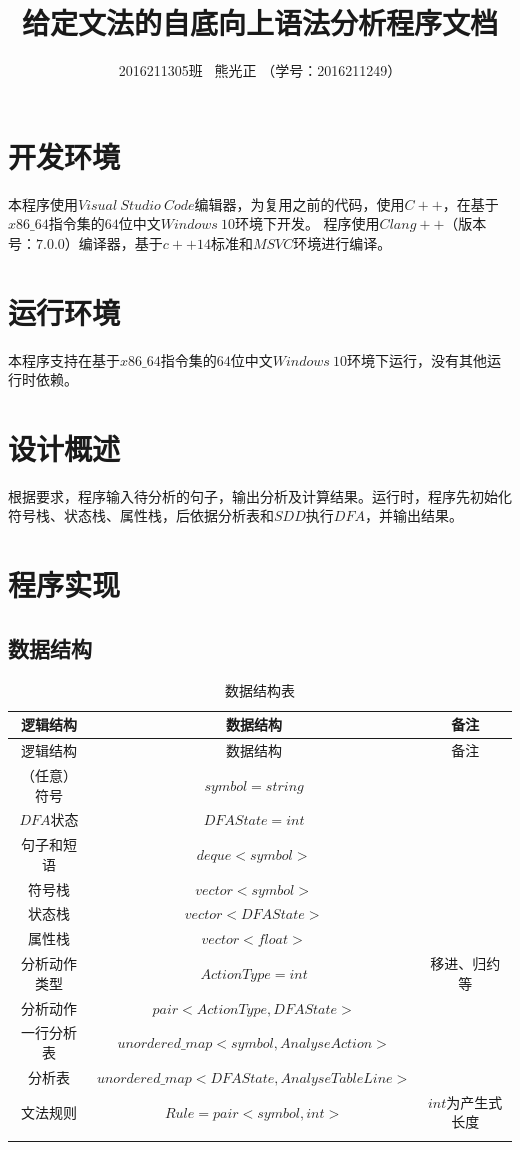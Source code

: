 \documentclass[UTF8]{ctexart}
\title{给定文法的自底向上语法分析程序文档}
\author{2016211305班 \ 熊光正 （学号：2016211249）}
\begin{document}
\lstset{numbers=left,frame=single,breaklines=true}
\maketitle
\tableofcontents
\clearpage
\section{开发环境}
本程序使用$Visual \ Studio \ Code$编辑器，为复用之前的代码，使用$C++$，在基于$x86\_64$指令集的$64$位中文$Windows \ 10$环境下开发。
程序使用$Clang++$（版本号：$7.0.0$）编译器，基于$c++14$标准和$MSVC$环境进行编译。
\section{运行环境}
本程序支持在基于$x86\_64$指令集的$64$位中文$Windows \ 10$环境下运行，没有其他运行时依赖。
\section{设计概述}
根据要求，程序输入待分析的句子，输出分析及计算结果。运行时，程序先初始化符号栈、状态栈、属性栈，后依据分析表和$SDD$执行$DFA$，并输出结果。
\section{程序实现}
\subsection{数据结构}
\begin{longtable}[c]{|c|c|c|}
    \hline
    逻辑结构 & 数据结构 & 备注 \\ \hline
    \endfirsthead
    \hline
    逻辑结构 & 数据结构 & 备注 \\ \hline
    \endhead
    （任意）符号  &  $symbol = string$ &  \\ \hline
    $DFA$状态  &  $DFAState = int$ &  \\ \hline
    句子和短语 & $deque<symbol>$  &   \\ \hline
    符号栈 & $vector<symbol>$  &   \\ \hline
    状态栈 & $vector<DFAState>$  &   \\ \hline
    属性栈 & $vector<float>$  &   \\ \hline
    分析动作类型 & $ActionType = int$  &  移进、归约等 \\ \hline
    分析动作 & $pair<ActionType, DFAState>$  &  \\ \hline
    一行分析表 & $unordered\_map<symbol, AnalyseAction>$  &  \\ \hline
    分析表 & $unordered\_map<DFAState, AnalyseTableLine>$  &  \\ \hline
    文法规则 & $Rule = pair<symbol, int>$  &  $int$为产生式长度 \\ \hline
    \caption{数据结构表}
    \label{数据结构表}\\
    \end{longtable}
\end{document}
